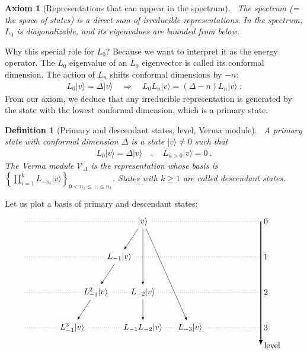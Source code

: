 \documentclass[12pt, a4paper]{article}
\theoremstyle{break}
\newtheorem{hyp}[exo]{Axiom}
\newtheorem{defn}[exo]{Definition}
\begin{document}
\begin{hyp}[Representations that can appear in the spectrum]
 ~\label{hyp:rep}
 The spectrum (= the space of states) is a direct sum of irreducible representations. In the spectrum, $L_0$ is diagonalizable, and its eigenvalues are bounded from below.
\end{hyp}
Why this special role for $L_0$? Because we want to interpret it as the energy operator. 
The $L_0$ eigenvalue of an $L_0$ eigenvector is called its conformal dimension. The action of $L_n$ shifts conformal dimensions by $-n$:
\begin{align}
 L_0|v\rangle = \Delta|v\rangle \quad \Rightarrow\quad  
 L_0 L_n|v\rangle 
 = (\Delta-n)L_n|v\rangle \ .
\end{align}
From our axiom, we deduce that any irreducible representation is generated by the state with the lowest conformal dimension, which is a primary state.

\begin{defn}[Primary and descendant states, level, Verma module]
 ~\label{def:prim}
 A primary state with conformal dimension $\Delta$ is a state $|v\rangle\neq 0$ such that 
 \begin{align}
  L_0 |v\rangle = \Delta |v\rangle \quad , \quad L_{n>0} |v\rangle = 0\ .
 \end{align}
The Verma module $\mathcal V_\Delta$ is the representation whose basis is 
 $
 \left\{ \prod_{i=1}^k L_{-n_i} |v\rangle\right\}_{ 0<n_1\leq \dots \leq n_k}
 $.
 States with $k\geq 1$ are called descendant states. 
\end{defn}
Let us plot a basis of primary and descendant states:
\begin{align}
 \begin{tikzpicture}[scale = .25, baseline=(current  bounding  box.center)]
  \draw[-latex, very thick] (20, 0) -- (20, -21) node [right] {level};
  \foreach \x in {0, ..., 3}
  {
  \draw [dotted] (-20, {-6*\x}) -- (20, {-6*\x}) node [right] {${\x}$};
  }
  \node[fill = white] at (0, 0) (0) {$|v\rangle$};
  \node[fill = white] at (-4,-6) (1) {$L_{-1}|v\rangle$};
  \node[fill = white] at (-8, -12) (11) {$L_{-1}^2|v\rangle$};
  \node[fill = white] at (-12, -18) (111) {$L_{-1}^3|v\rangle$};
  \node[fill = white] at (0,-12) (2) {$L_{-2}|v\rangle$};
  \node[fill = white] at (0,-18) (12) {$L_{-1}L_{-2}|v\rangle$};
  \node[fill = white] at (8,-18) (3) {$L_{-3}|v\rangle$};
  \draw[-latex] (0) -- (1);
  \draw[-latex] (1) -- (11);
  \draw[-latex] (11) -- (111);
  \draw[-latex] (0) -- (2);
  \draw[-latex] (0) -- (3);
  \draw[-latex] (2) -- (12);
 \end{tikzpicture}
\end{align}
\end{document}
